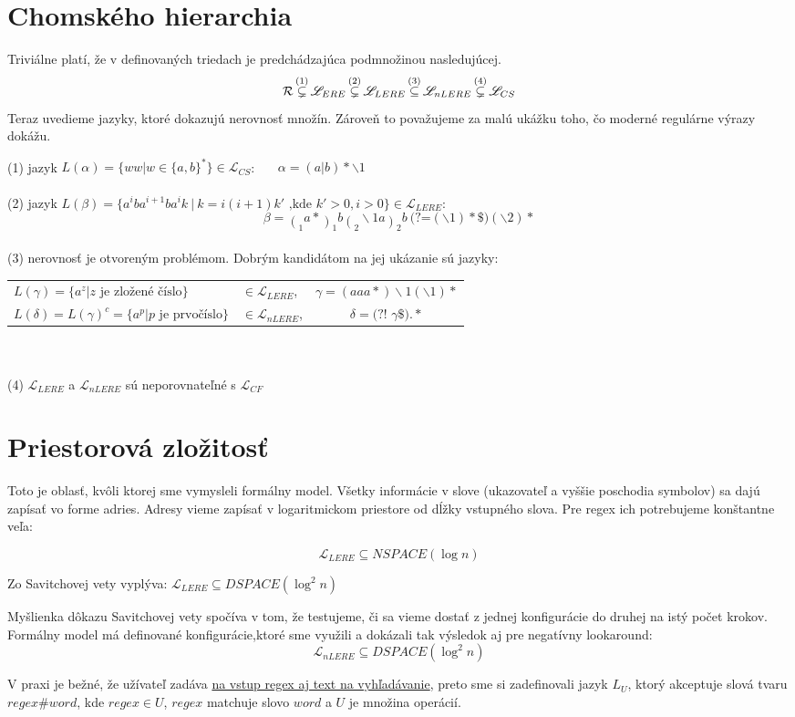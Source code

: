 \documentclass[myposter,portrait,plainboxedsections]{sciposter}
\def\R{{\cal R}} %
\def\L{\mathscr{L}} %
\def\el{\mathscr{L}_{ERE}}
\def\lel{\mathscr{L}_{LERE}}
\def\nlel{\mathscr{L}_{nLERE}}
\def\lookahead{\text{(?=}}
\def\nlookahead{\text{(?!~}}
\def\mysection#1{
{\color{sectionCol}\section*{\sc\bfseries #1}}}
\begin{document}
\begin{multicols*}{3}
\mysection{Chomského hierarchia}
Triviálne platí, že v definovaných triedach je predchádzajúca podmnožinou nasledujúcej.
$$\R \mathop{\subsetneq}^{(1)} \el \mathop{\subsetneq}^{(2)} \lel \mathop{\subseteq}^{(3)} \nlel \mathop{\subsetneq}^{(4)} \L_{CS}$$
Teraz uvedieme jazyky, ktoré dokazujú nerovnosť množín. Zároveň to považujeme za malú ukážku toho, čo moderné regulárne výrazy dokážu.

(1) jazyk $L(\alpha) = \lbrace ww|w \in\lbrace a,b \rbrace^* \rbrace \in \L_{CS}$:~~~ $\alpha = (a|b)*\backslash 1$
\\ \\
(2) jazyk $L(\beta)=\lbrace a^iba^{i+1}ba^ik ~|~ k=i(i+1)k' \text{ ,kde } k'>0,i>0\rbrace \in \lel$: 
$$\beta=\mathop{(}_1 a*\mathop{)}_1 b \mathop{(}_2 \backslash 1 a \mathop{)}_2 b~ \lookahead (\backslash 1) *\$ ) (\backslash 2)* $$
\\ 
(3) nerovnosť je otvoreným problémom. Dobrým kandidátom na jej ukázanie sú jazyky:

\begin{tabular}{llc}
$L(\gamma) = \lbrace a^z | z \text{ je zložené číslo} \rbrace$ & $\in\lel$, & $\gamma = (aaa*)\backslash 1(\backslash 1)*$ \\
$L(\delta) = L(\gamma)^c = \lbrace a^p | p \text{ je prvočíslo} \rbrace$ & $\in\nlel$, & $\delta=\nlookahead \gamma\$).*$
\end{tabular}
\\ \\
(4) $\lel$ a $\nlel$ sú neporovnateľné s $\L_{CF}$

\mysection{Priestorová zložitosť}
Toto je oblasť, kvôli ktorej sme vymysleli formálny model. Všetky informácie v slove (ukazovateľ a vyššie poschodia symbolov) sa dajú zapísať vo forme adries. Adresy vieme zapísať v logaritmickom priestore od dĺžky vstupného slova. Pre regex ich potrebujeme konštantne veľa:

$$\lel \subseteq NSPACE(\log n)$$

Zo Savitchovej vety vyplýva:
$\lel \subseteq DSPACE(\log^2 n)$

Myšlienka dôkazu Savitchovej vety spočíva v tom, že testujeme, či sa vieme dostať z jednej konfigurácie do druhej na istý počet krokov. Formálny model má definované konfigurácie,ktoré sme využili a dokázali tak výsledok aj pre negatívny lookaround:
$$\nlel \subseteq DSPACE(\log^2 n)$$

V praxi je bežné, že užívateľ zadáva \underline{na vstup regex aj text na vyhľadávanie}, preto sme si zadefinovali jazyk $L_U$, ktorý akceptuje slová tvaru $regex\#word$, kde $regex\in U$, $regex$ matchuje slovo $word$ a $U$ je množina operácií.


\end{multicols*}
\end{document}
